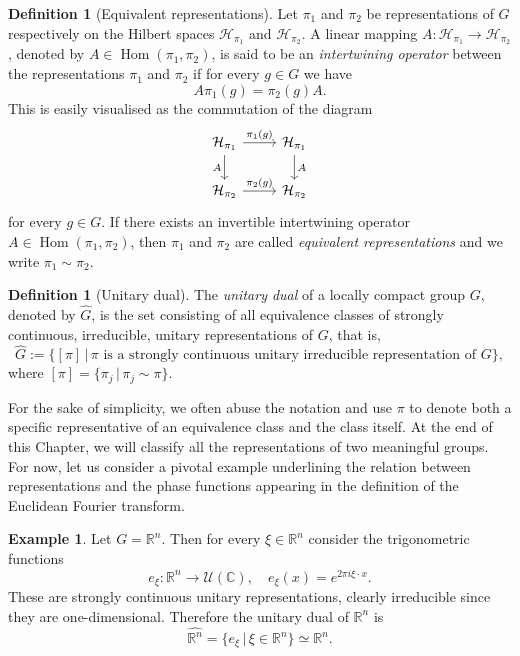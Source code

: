 \documentclass[12pt,oneside,a4paper]{book}
\numberwithin{equation}{section}     %
\theoremstyle{plain}
\theoremstyle{definition}
\newtheorem{definition}[theorem]{Definition}
\newtheorem{example}[theorem]{Example}
\DeclareMathOperator{\Hom}{Hom}
\newcommand{\C}{{\mathbb C}}
\newcommand{\R}{{\mathbb R}}
\newcommand{\Rn}{{\R}^n}
\begin{document}
\begin{definition}[Equivalent representations]
	Let $\pi_1$ and $\pi_2$ be representations of $G$ respectively on the Hilbert spaces $\mathcal{H}_{\pi_1}$ and $\mathcal{H}_{\pi_2}$. A linear mapping $A:\mathcal{H}_{\pi_1}\rightarrow \mathcal{H}_{\pi_2}$, denoted by $A\in \Hom(\pi_1,\pi_2)$, is said to be an \textit{intertwining operator} between the representations $\pi_1$ and $\pi_2$ if for every $g\in G$ we have
	\[
	A\pi_1(g)=\pi_2(g)A.
	\]
	This is easily visualised as the commutation of the diagram
	\[ 
	\begin{tikzcd}
	\mathcal{H}_{\pi_1} \arrow{r}{\pi_1(g)} \arrow[swap]{d}{A} & \mathcal{H}_{\pi_1} \arrow{d}{A} \\
	\mathcal{H}_{\pi_2} \arrow{r}{\pi_2(g)}& \mathcal{H}_{\pi_2}
	\end{tikzcd}
	\]
	for every $g\in G$.
	If there exists an invertible intertwining operator $A\in \Hom(\pi_1,\pi_2)$, then $\pi_1$ and $\pi_2$ are called \textit{equivalent representations} and we write $\pi_1\sim\pi_2$.
\end{definition}

\begin{definition}[Unitary dual]
	The \textit{unitary dual} of a locally compact group $G$, denoted by $\widehat G$, is the set consisting of all equivalence classes of strongly continuous, irreducible, unitary representations of $G$, that is,
	\[
	\widehat{G}:=\big\{[\pi]\,|\,\pi \text{ is a strongly continuous unitary irreducible representation of }G \big\},
	\]
	where $[\pi]=\{\pi_j\,|\,\pi_j\sim\pi\}$.
\end{definition}

For the sake of simplicity, we often abuse the notation and use $\pi$ to denote both a specific representative of an equivalence class and the class itself. At the end of this Chapter, we will classify all the representations of two meaningful groups. For now, let us consider a pivotal example underlining the relation between representations and the phase functions appearing in the definition of the Euclidean Fourier transform.

\begin{example}\label{trigonometrics}
	Let $G=\Rn$. Then for every $\xi\in\Rn$ consider the trigonometric functions
	\[
	e_\xi: \Rn\rightarrow \mathcal{U}(\C),\quad e_\xi(x)=e^{2\pi i \xi\cdot x}.
	\]
	These are strongly continuous unitary representations, clearly irreducible since they are one-dimensional. Therefore the unitary dual of $\Rn$ is 
	\[
	\widehat{\Rn}=\big\{e_\xi\,|\,\xi\in\Rn\big\}\simeq\Rn.
	\]
\end{example}
\end{document}
